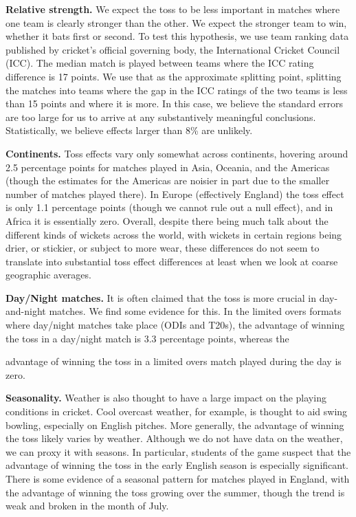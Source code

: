 \documentclass[11pt,  letterpaper]{article}
\begin{document}
\textbf{Relative strength.} We expect the toss to be less important in matches where one team is clearly stronger than the other. We expect the stronger team to win, whether it bats first or second. To test this hypothesis, we use team ranking data published by cricket's official governing body, the International Cricket Council (ICC). The median match is played between teams where the ICC rating difference is 17 points. We use that as the approximate splitting point, splitting the matches into teams where the gap in the ICC ratings of the two teams is less than 15 points and where it is more. In this case, we believe the standard errors are too large for us to arrive at any substantively meaningful conclusions. Statistically, we believe effects larger than 8\% are unlikely. 

\textbf{Continents.} Toss effects vary only somewhat across continents, hovering around 2.5 percentage points for matches played in Asia, Oceania, and the Americas (though the estimates for the Americas are noisier in part due to the smaller number of matches played there). In Europe (effectively England) the toss effect is only 1.1 percentage points (though we cannot rule out a null effect), and in Africa it is essentially zero. Overall, despite there being much talk about the different kinds of wickets across the world, with wickets in certain regions being drier, or stickier, or subject to more wear, these differences do not seem to translate into substantial toss effect differences at least when we look at coarse geographic averages.

\textbf{Day/Night matches.} It is often claimed that the toss is more crucial in day-and-night matches. We find some evidence for this. In the limited overs formats where day/night matches take place (ODIs and T20s), the advantage of winning the toss in a day/night match is 3.3 percentage points, whereas the

advantage of winning the toss in a limited overs match played during the day is zero. 

\textbf{Seasonality.} Weather is also thought to have a large impact on the playing conditions in cricket. Cool overcast weather, for example, is thought to aid swing bowling, especially on English pitches. More generally, the advantage of winning the toss likely varies by weather. Although we do not have data on the weather, we can proxy it with seasons. In particular, students of the game suspect that the advantage of winning the toss in the early English season is especially significant. There is some evidence of a seasonal pattern for matches played in England, with the advantage of winning the toss growing over the summer, though the trend is weak and broken in the month of July.
\end{document}
